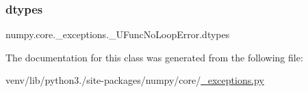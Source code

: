 \subsubsection{\texorpdfstring{dtypes}{dtypes}}
{\footnotesize\ttfamily numpy.\+core.\+\_\+exceptions.\+\_\+\+U\+Func\+No\+Loop\+Error.\+dtypes}



The documentation for this class was generated from the following file\+:\begin{DoxyCompactItemize}
\item 
venv/lib/python3./site-\/packages/numpy/core/\hyperlink{__exceptions_8py}{\+\_\+exceptions.\+py}\end{DoxyCompactItemize}
